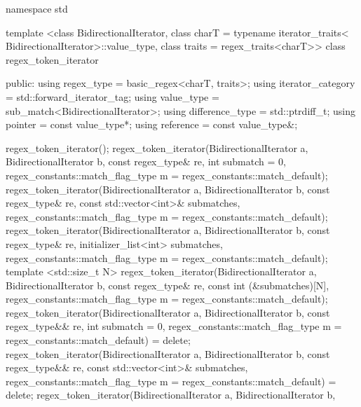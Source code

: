 \begin{codeblock}
namespace std {
  template <class BidirectionalIterator, 
            class charT = typename iterator_traits<
              BidirectionalIterator>::value_type,
            class traits = regex_traits<charT>>
  class regex_token_iterator {
  public:
    using regex_type        = basic_regex<charT, traits>;
    using iterator_category = std::forward_iterator_tag;
    using value_type        = sub_match<BidirectionalIterator>;
    using difference_type   = std::ptrdiff_t;
    using pointer           = const value_type*;
    using reference         = const value_type&;

    regex_token_iterator();
    regex_token_iterator(BidirectionalIterator a, BidirectionalIterator b, 
                        const regex_type& re, 
                        int submatch = 0, 
                        regex_constants::match_flag_type m =
                          regex_constants::match_default);
    regex_token_iterator(BidirectionalIterator a, BidirectionalIterator b, 
                        const regex_type& re, 
                        const std::vector<int>& submatches, 
                        regex_constants::match_flag_type m =
                          regex_constants::match_default);
    regex_token_iterator(BidirectionalIterator a, BidirectionalIterator b,
                        const regex_type& re,
                        initializer_list<int> submatches,
                        regex_constants::match_flag_type m =
                          regex_constants::match_default);
    template <std::size_t N>
      regex_token_iterator(BidirectionalIterator a, BidirectionalIterator b, 
                        const regex_type& re, 
                        const int (&submatches)[N], 
                        regex_constants::match_flag_type m =
                          regex_constants::match_default);
    regex_token_iterator(BidirectionalIterator a, BidirectionalIterator b,
                         const regex_type&& re,
                         int submatch = 0,
                         regex_constants::match_flag_type m =
                           regex_constants::match_default) = delete;
    regex_token_iterator(BidirectionalIterator a, BidirectionalIterator b,
                         const regex_type&& re,
                         const std::vector<int>& submatches,
                         regex_constants::match_flag_type m =
                           regex_constants::match_default) = delete;
    regex_token_iterator(BidirectionalIterator a, BidirectionalIterator b,
}}
\end{codeblock}
